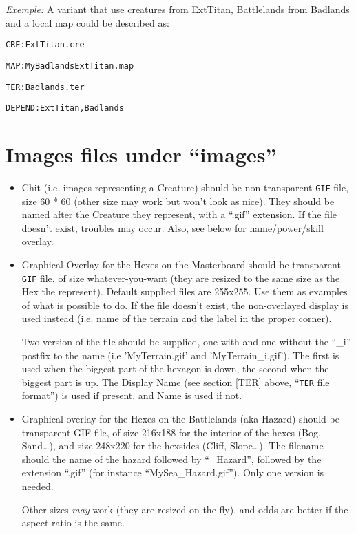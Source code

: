 \documentclass{article}
\begin{document}
\textit{Exemple:} A variant that use creatures from ExtTitan, Battlelands from Badlands and a local map could be described as:

\texttt{\texttt{CRE}:ExtTitan.cre}

\texttt{\texttt{MAP}:MyBadlandsExtTitan.map}

\texttt{\texttt{TER}:Badlands.ter}

\texttt{\texttt{DEPEND}:ExtTitan,Badlands}

\section{Images files under ``images''}
\label{images}

\begin{itemize}
\item Chit (i.e. images representing a Creature) should be non-transparent \texttt{GIF} file, size 60 * 60 (other size may work but won't look as nice). They should be named after the Creature they represent, with a ``.gif'' extension. If the file doesn't exist, troubles may occur. Also, see below for name/power/skill overlay.

\item Graphical Overlay for the Hexes on the Masterboard should be transparent \texttt{GIF} file, of size whatever-you-want (they are resized to the same size as the Hex the represent). Default supplied files are 255x255. Use them as examples of what is possible to do. If the file doesn't exist, the non-overlayed display is used instead (i.e. name of the terrain and the label in the proper corner).

Two version of the file should be supplied, one with and one without the ``\_i'' postfix to the name (i.e 'MyTerrain.gif' and 'MyTerrain\_i.gif'). The first is used when the biggest part of the hexagon is down, the second when the biggest part is up. The Display Name (see section \ref{TER} above, ``\texttt{TER} file format'') is used if present, and Name is used if not.

\item Graphical overlay for the Hexes on the Battlelands (aka Hazard) should be transparent GIF file, of size 216x188 for the interior of the hexes (Bog, Sand\ldots), and size 248x220 for the hexsides (Cliff, Slope\ldots). The filename should the name of the hazard followed by ``\_Hazard'', followed by the extension ``.gif'' (for instance ``MySea\_Hazard.gif''). Only one version is needed.

Other sizes \emph{may} work (they are resized on-the-fly), and odds are better if the aspect ratio is the same.


\end{itemize}
\end{document}
